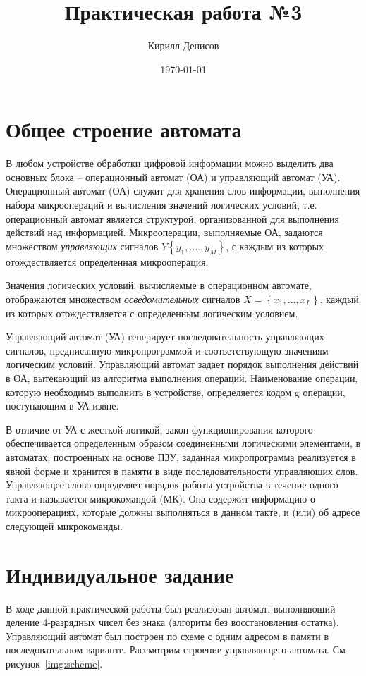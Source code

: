 \documentclass[a4paper,14pt]{extarticle}
\author{Кирилл Денисов}
\title{Практическая работа №3}
\date{\today}
\newcommand{\pathToCommonFolder}{/home/denilai/Desktop/LaTeX/Common}
\begin{document}
	\thispagestyle{empty}
	
	
	
	\newpage
	\tableofcontents
	\newpage
	
\section{Общее строение автомата}
В любом устройстве обработки цифровой информации можно выделить два основных блока – операционный автомат (ОА) и управляющий автомат (УА). Операционный автомат (ОА) служит для хранения слов информации, выполнения набора микроопераций и вычисления значений логических условий, т.е. операционный автомат является структурой, организованной для выполнения действий над информацией. Микрооперации, выполняемые ОА, задаются множеством \textit{управляющих} сигналов $Y\left\{y_1,....,y_M\right\}$, с каждым из которых отождествляется определенная микрооперация.

Значения логических условий, вычисляемые в операционном автомате, отображаются множеством \textit{осведомительных} сигналов $X=\left\{x_1,...,x_L\right\}$, каждый из которых отождествляется с определенным логическим условием.

Управляющий автомат (УА) генерирует последовательность управляющих сигналов, предписанную микропрограммой и соответствующую значениям логическим условий. Управляющий автомат задает порядок выполнения действий в ОА, вытекающий из алгоритма выполнения операций. Наименование операции, которую необходимо выполнить в устройстве, определяется кодом g операции, поступающим в УА извне. 

В отличие от УА с жесткой логикой, закон функционирования которого обеспечивается определенным образом соединенными логическими элементами, в автоматах, построенных на основе ПЗУ, заданная микропрограмма реализуется в явной форме и хранится в памяти в виде последовательности управляющих слов. Управляющее слово определяет порядок работы устройства в течение одного такта и называется микрокомандой (МК). Она содержит информацию о микрооперациях, которые должны выполняться в данном такте, и (или) об адресе следующей микрокоманды.
\section{Индивидуальное задание}
В ходе данной практической работы был реализован автомат, выполняющий деление 4-разрядных чисел без знака (алгоритм без восстановления остатка). Управляющий автомат был построен по схеме с одним адресом в памяти в последовательном варианте. Рассмотрим строение управляющего автомата. См рисунок~\ref{img:scheme}.
\end{document}
